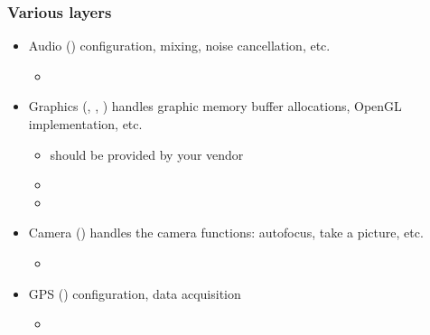\begin{frame}
  \frametitle{Various layers}
  \begin{itemize}
  \item Audio () configuration, mixing, noise
    cancellation, etc.
    \begin{itemize}
    \item {}
    \end{itemize}
  \item Graphics (, ,
    ) handles graphic memory buffer allocations,
    OpenGL implementation, etc.
    \begin{itemize}
    \item {} should be provided by your vendor
    \item {}
    \item {}
    \end{itemize}
  \item Camera () handles the camera functions:
    autofocus, take a picture, etc.
    \begin{itemize}
      \item {}
    \end{itemize}
  \item GPS () configuration, data acquisition
    \begin{itemize}
    \item {}
    \end{itemize}
  \end{itemize}
\end{frame}


